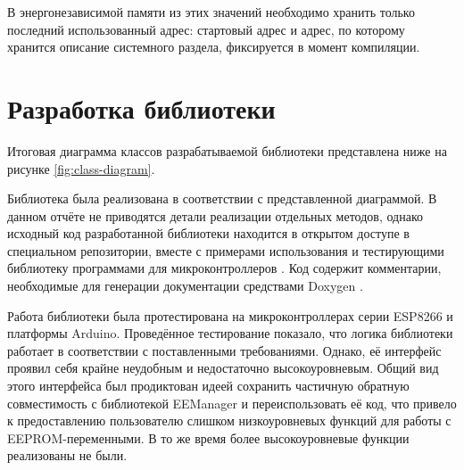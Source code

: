 В энергонезависимой памяти из этих значений необходимо хранить только последний использованный адрес: стартовый адрес и адрес, по которому хранится описание системного раздела, фиксируется в момент компиляции.

\section{Разработка библиотеки}

Итоговая диаграмма классов разрабатываемой библиотеки представлена ниже на рисунке \ref{fig:class-diagram}.



Библиотека была реализована в соответствии с представленной диаграммой.
В данном отчёте не приводятся детали реализации отдельных методов, однако исходный код разработанной библиотеки находится в открытом доступе в специальном репозитории, вместе с примерами использования и тестирующими библиотеку программами для микроконтроллеров \cite{web:my-eemanager}.
Код содержит комментарии, необходимые для генерации документации средствами Doxygen \cite{web:doxygen}.

Работа библиотеки была протестирована на микроконтроллерах серии ESP8266 и платформы Arduino.
Проведённое тестирование показало, что логика библиотеки работает в соответствии с поставленными требованиями.
Однако, её интерфейс проявил себя крайне неудобным и недостаточно высокоуровневым.
Общий вид этого интерфейса был продиктован идеей сохранить частичную обратную совместимость с библиотекой EEManager и переиспользовать её код, что привело к предоставлению пользователю слишком низкоуровневых функций для работы с EEPROM-переменными. 
В то же время более высокоуровневые функции реализованы не были.

